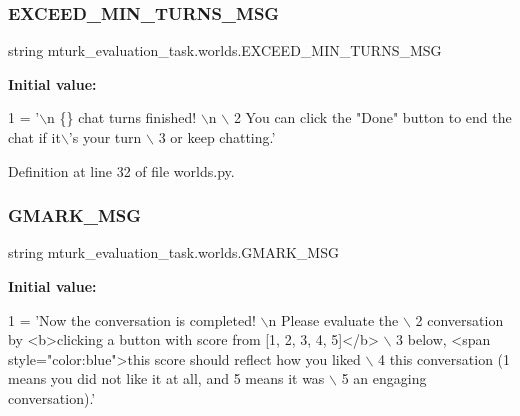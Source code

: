 \subsubsection{\texorpdfstring{E\+X\+C\+E\+E\+D\+\_\+\+M\+I\+N\+\_\+\+T\+U\+R\+N\+S\+\_\+\+M\+SG}{EXCEED\_MIN\_TURNS\_MSG}}
{\footnotesize\ttfamily string mturk\+\_\+evaluation\+\_\+task.\+worlds.\+E\+X\+C\+E\+E\+D\+\_\+\+M\+I\+N\+\_\+\+T\+U\+R\+N\+S\+\_\+\+M\+SG}

{\bfseries Initial value\+:}
\begin{DoxyCode}
1 =  \textcolor{stringliteral}{'\(\backslash\)n \{\} chat turns finished! \(\backslash\)n \(\backslash\)}
2 \textcolor{stringliteral}{        You can click the "Done" button to end the chat if it\(\backslash\)'s your turn \(\backslash\)}
3 \textcolor{stringliteral}{        or keep chatting.'}
\end{DoxyCode}


Definition at line 32 of file worlds.\+py.

\mbox{\label{namespacemturk__evaluation__task_1_1worlds_a9a2c4ec1c2b6fae63e448ba6be717206}} 
\subsubsection{\texorpdfstring{G\+M\+A\+R\+K\+\_\+\+M\+SG}{GMARK\_MSG}}
{\footnotesize\ttfamily string mturk\+\_\+evaluation\+\_\+task.\+worlds.\+G\+M\+A\+R\+K\+\_\+\+M\+SG}

{\bfseries Initial value\+:}
\begin{DoxyCode}
1 =  \textcolor{stringliteral}{'Now the conversation is completed! \(\backslash\)n Please evaluate the \(\backslash\)}
2 \textcolor{stringliteral}{    conversation by <b>clicking a button with score from [1, 2, 3, 4, 5]</b> \(\backslash\)}
3 \textcolor{stringliteral}{    below, <span style="color:blue">this score should reflect how you liked \(\backslash\)}
4 \textcolor{stringliteral}{    this conversation (1 means you did not like it at all, and 5 means it was  \(\backslash\)}
5 \textcolor{stringliteral}{    an engaging conversation).'}
\end{DoxyCode}


